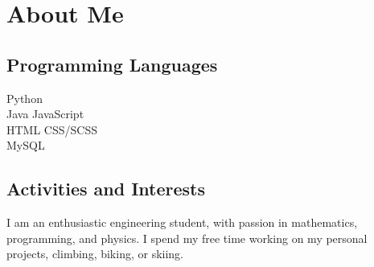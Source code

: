 \documentclass[]{deedy-resume-openfont}
\begin{document}
    \section{About Me}
    \begin{minipage}[t]{.35\textwidth}
    \subsection{Programming Languages}
    Python \\
    Java \textbullet{} JavaScript  \\ 
    HTML \textbullet{} CSS/SCSS \\
    MySQL
    \sectionsep
    \end{minipage}
    \hfill
    \begin{minipage}[t]{.55\textwidth}
    \subsection{Activities and Interests}
    I am an enthusiastic engineering student, with passion in mathematics, programming, and physics. I spend my free time working on my personal projects, climbing, biking, or skiing.
    \end{minipage}
    
    
\end{document}
